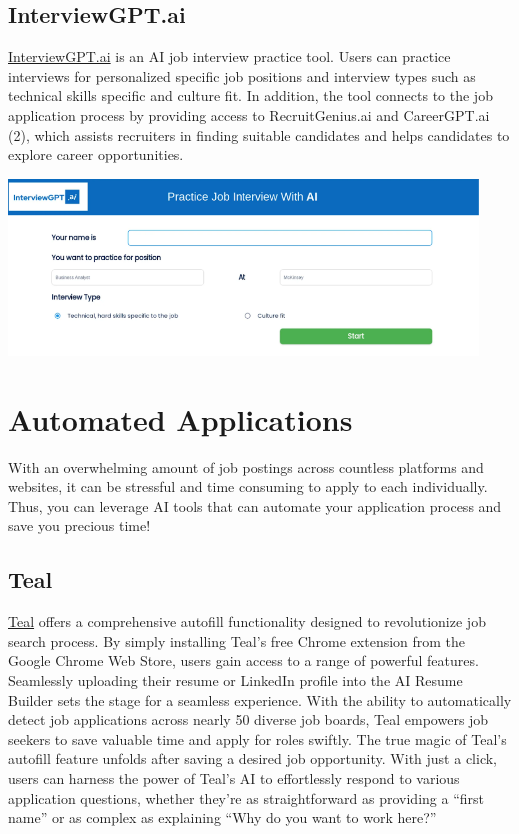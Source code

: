 \documentclass[
]{book}
\begin{document}
\hypertarget{interviewgpt.ai}{%
\section{InterviewGPT.ai}\label{interviewgpt.ai}}

\href{https://interviewgpt.ai/}{InterviewGPT.ai} is an AI job interview practice tool. Users can practice interviews for personalized specific job positions and interview types such as technical skills specific and culture fit. In addition, the tool connects to the job application process by providing access to RecruitGenius.ai and CareerGPT.ai (2), which assists recruiters in finding suitable candidates and helps candidates to explore career opportunities.

\includegraphics[width=4.90625in,height=\textheight]{intergptai pic.png}

\hypertarget{automated-applications}{%
\chapter{Automated Applications}\label{automated-applications}}

With an overwhelming amount of job postings across countless platforms and websites, it can be stressful and time consuming to apply to each individually. Thus, you can leverage AI tools that can automate your application process and save you precious time!

\hypertarget{teal}{%
\section{Teal}\label{teal}}

\href{https://www.tealhq.com/tools/autofill-job-applications}{Teal} offers a comprehensive autofill functionality designed to revolutionize job search process. By simply installing Teal's free Chrome extension from the Google Chrome Web Store, users gain access to a range of powerful features. Seamlessly uploading their resume or LinkedIn profile into the AI Resume Builder sets the stage for a seamless experience. With the ability to automatically detect job applications across nearly 50 diverse job boards, Teal empowers job seekers to save valuable time and apply for roles swiftly. The true magic of Teal's autofill feature unfolds after saving a desired job opportunity. With just a click, users can harness the power of Teal's AI to effortlessly respond to various application questions, whether they're as straightforward as providing a ``first name'' or as complex as explaining ``Why do you want to work here?''
\end{document}
